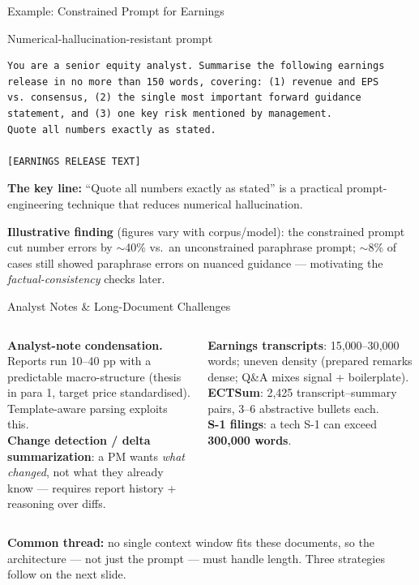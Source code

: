 \documentclass[9pt,t]{beamer}
\begin{document}
\begin{frame}[fragile]{Example: Constrained Prompt for Earnings}
\begin{exampleblock}{Numerical-hallucination-resistant prompt}
\begin{verbatim}
You are a senior equity analyst. Summarise the following earnings
release in no more than 150 words, covering: (1) revenue and EPS
vs. consensus, (2) the single most important forward guidance
statement, and (3) one key risk mentioned by management.
Quote all numbers exactly as stated.

[EARNINGS RELEASE TEXT]
\end{verbatim}
\end{exampleblock}

\medskip
\textbf{The key line:} ``Quote all numbers exactly as stated'' is a practical
prompt-engineering technique that reduces numerical hallucination.

\medskip
\textbf{Illustrative finding} (figures vary with corpus/model): the constrained
prompt cut number errors by $\sim$40\% vs.\ an unconstrained paraphrase prompt;
$\sim$8\% of cases still showed paraphrase errors on nuanced guidance ---
motivating the \emph{factual-consistency} checks later.
\end{frame}

\begin{frame}{Analyst Notes \& Long-Document Challenges}
\begin{columns}[T]
\textbf{Analyst-note condensation.} Reports run 10--40 pp with a predictable
macro-structure (thesis in para 1, target price standardised). Template-aware
parsing exploits this.
\\[3pt]
\textbf{Change detection / delta summarization}: a PM wants \emph{what changed},
not what they already know --- requires report history + reasoning over diffs.

\textbf{Earnings transcripts}: 15{,}000--30{,}000 words; uneven density
(prepared remarks dense; Q\&A mixes signal + boilerplate). \textbf{ECTSum}: 2{,}425
transcript--summary pairs, 3--6 abstractive bullets each.
\\[3pt]
\textbf{S-1 filings}: a tech S-1 can exceed \textbf{300{,}000 words}.
\end{columns}

\medskip
\textbf{Common thread:} no single context window fits these documents, so the
architecture --- not just the prompt --- must handle length. Three strategies
follow on the next slide.
\end{frame}
\end{document}
